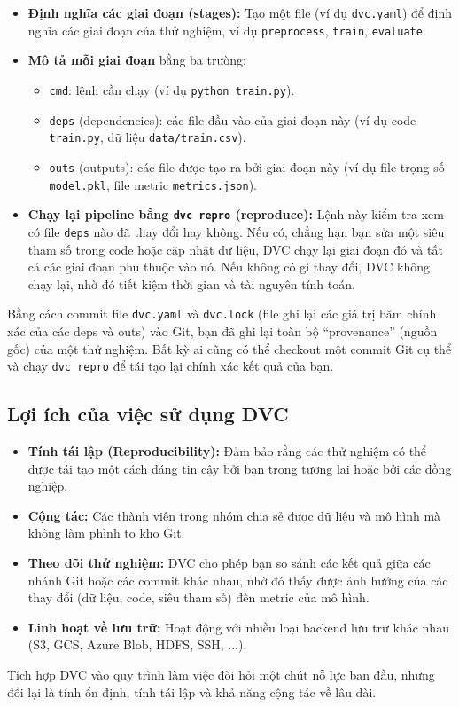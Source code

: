 \begin{itemize}
    \item \textbf{Định nghĩa các giai đoạn (stages):} Tạo một file (ví dụ \texttt{dvc.yaml}) để định nghĩa các giai đoạn của thử nghiệm, ví dụ \texttt{preprocess}, \texttt{train}, \texttt{evaluate}.
    \item \textbf{Mô tả mỗi giai đoạn} bằng ba trường:
        \begin{itemize}
            \item \texttt{cmd}: lệnh cần chạy (ví dụ \texttt{python train.py}).
            \item \texttt{deps} (dependencies): các file đầu vào của giai đoạn này (ví dụ code \texttt{train.py}, dữ liệu \texttt{data/train.csv}).
            \item \texttt{outs} (outputs): các file được tạo ra bởi giai đoạn này (ví dụ file trọng số \texttt{model.pkl}, file metric \texttt{metrics.json}).
        \end{itemize}
    \item \textbf{Chạy lại pipeline bằng \texttt{dvc repro} (reproduce):} Lệnh này kiểm tra xem có file \texttt{deps} nào đã thay đổi hay không. Nếu có, chẳng hạn bạn sửa một siêu tham số trong code hoặc cập nhật dữ liệu, DVC chạy lại giai đoạn đó và tất cả các giai đoạn phụ thuộc vào nó. Nếu không có gì thay đổi, DVC không chạy lại, nhờ đó tiết kiệm thời gian và tài nguyên tính toán.
\end{itemize}
Bằng cách commit file \texttt{dvc.yaml} và \texttt{dvc.lock} (file ghi lại các giá trị băm chính xác của các deps và outs) vào Git, bạn đã ghi lại toàn bộ “provenance” (nguồn gốc) của một thử nghiệm. Bất kỳ ai cũng có thể checkout một commit Git cụ thể và chạy \texttt{dvc repro} để tái tạo lại chính xác kết quả của bạn.

\subsection{Lợi ích của việc sử dụng DVC}
\begin{itemize}
    \item \textbf{Tính tái lập (Reproducibility):} Đảm bảo rằng các thử nghiệm có thể được tái tạo một cách đáng tin cậy bởi bạn trong tương lai hoặc bởi các đồng nghiệp.
    \item \textbf{Cộng tác:} Các thành viên trong nhóm chia sẻ được dữ liệu và mô hình mà không làm phình to kho Git.
    \item \textbf{Theo dõi thử nghiệm:} DVC cho phép bạn so sánh các kết quả giữa các nhánh Git hoặc các commit khác nhau, nhờ đó thấy được ảnh hưởng của các thay đổi (dữ liệu, code, siêu tham số) đến metric của mô hình.
    \item \textbf{Linh hoạt về lưu trữ:} Hoạt động với nhiều loại backend lưu trữ khác nhau (S3, GCS, Azure Blob, HDFS, SSH, ...).
\end{itemize}
Tích hợp DVC vào quy trình làm việc đòi hỏi một chút nỗ lực ban đầu, nhưng đổi lại là tính ổn định, tính tái lập và khả năng cộng tác về lâu dài.
